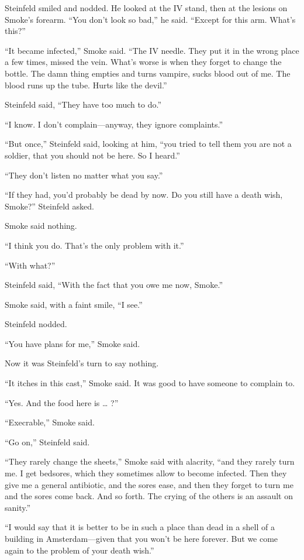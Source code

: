 Steinfeld smiled and nodded. He looked at the IV stand, then at the lesions on Smoke’s forearm. “You don’t look so bad,” he said. “Except for this arm. What’s this?”

“It became infected,” Smoke said. “The IV needle. They put it in the wrong place a few times, missed the vein. What’s worse is when they forget to change the bottle. The damn thing empties and turns vampire, sucks blood out of me. The blood runs up the tube. Hurts like the devil.”

Steinfeld said, “They have too much to do.”

“I know. I don’t complain—anyway, they ignore complaints.”

“But once,” Steinfeld said, looking at him, “you tried to tell them you are not a soldier, that you should not be here. So I heard.”

“They don’t listen no matter what you say.”

“If they had, you’d probably be dead by now. Do you still have a death wish, Smoke?” Steinfeld asked.

Smoke said nothing.

“I think you do. That’s the only problem with it.”

“With what?”

Steinfeld said, “With the fact that you owe me now, Smoke.”

Smoke said, with a faint smile, “I see.”

Steinfeld nodded.

“You have plans for me,” Smoke said.

Now it was Steinfeld’s turn to say nothing.

“It itches in this cast,” Smoke said. It was good to have someone to complain to.

“Yes. And the food here is … ?”

“Execrable,” Smoke said.

“Go on,” Steinfeld said.

“They rarely change the sheets,” Smoke said with alacrity, “and they rarely turn me. I get bedsores, which they sometimes allow to become infected. Then they give me a general antibiotic, and the sores ease, and then they forget to turn me and the sores come back. And so forth. The crying of the others is an assault on sanity.”

“I would say that it is better to be in such a place than dead in a shell of a building in Amsterdam—given that you won’t be here forever. But we come again to the problem of your death wish.”

